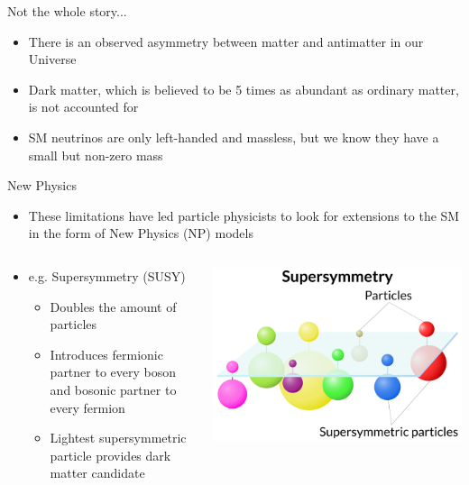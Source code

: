 \documentclass[aspectratio=1610]{beamer}
\begin{document}
\begin{frame}{Not the whole story...}
\begin{itemize}
  \item There is an observed asymmetry between matter and antimatter in our Universe
  \item Dark matter, which is believed to be 5 times as abundant as ordinary matter, is not accounted for
  \item SM neutrinos are only left-handed and massless, but we know they have a small but non-zero mass
\end{itemize}
\end{frame}

\begin{frame}{New Physics}
\begin{itemize}
\item These limitations have led particle physicists to look for extensions to the SM in the form of New Physics (NP) models
\end{itemize}

\begin{columns}
\begin{column}{0.5\textwidth}
\begin{itemize}
  \item e.g. Supersymmetry (SUSY)
\begin{itemize}
  \item Doubles the amount of particles
  \item Introduces fermionic partner to every boson and bosonic partner to every fermion
  \item Lightest supersymmetric particle provides dark matter candidate
\end{itemize}
\end{itemize}
\end{column}
\begin{column}{0.5\textwidth}
\includegraphics[width=\textwidth]{figs/supersymmetry.jpg}
\end{column}
\end{columns}


\end{frame}
\end{document}
